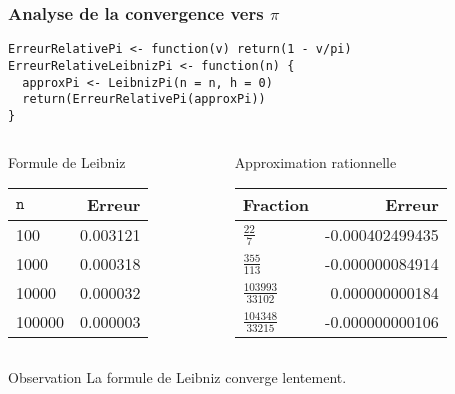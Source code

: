 \documentclass[10pt]{beamer}
\begin{document}
\begin{frame}[fragile]
  \frametitle{Analyse de la convergence vers $\pi$}
  \begin{lstlisting}[style=editor]
ErreurRelativePi <- function(v) return(1 - v/pi)
ErreurRelativeLeibnizPi <- function(n) {
  approxPi <- LeibnizPi(n = n, h = 0)
  return(ErreurRelativePi(approxPi))
}
\end{lstlisting}



\begin{columns}[t]
\begin{column}{0.48\textwidth}
  \begin{exampleblock}{Formule de Leibniz}
    \begin{tabular}{lr}
      \toprule
    $\mathtt{n}$ & Erreur   \\
    \midrule
    100          & 0.003121 \\
    1000         & 0.000318 \\
    10000        & 0.000032 \\
    100000       & 0.000003 \\
      \bottomrule
  \end{tabular}
    
  \end{exampleblock}

\end{column}
\begin{column}{0.48\textwidth}
  \begin{exampleblock}{Approximation rationnelle}
    \begin{tabular}{lr}
    \toprule
    Fraction               & Erreur          \\
    \midrule
    $\frac{22}{7}$         & -0.000402499435 \\
    $\frac{355}{113}$      & -0.000000084914 \\
    $\frac{103993}{33102}$ & 0.000000000184  \\
    $\frac{104348}{33215}$ & -0.000000000106 \\
    \bottomrule
  \end{tabular}
  \end{exampleblock}
\end{column}
\end{columns}



\begin{alertblock}{Observation}
  \alert{La formule de Leibniz converge lentement.}
\end{alertblock}

\end{frame}
\end{document}
